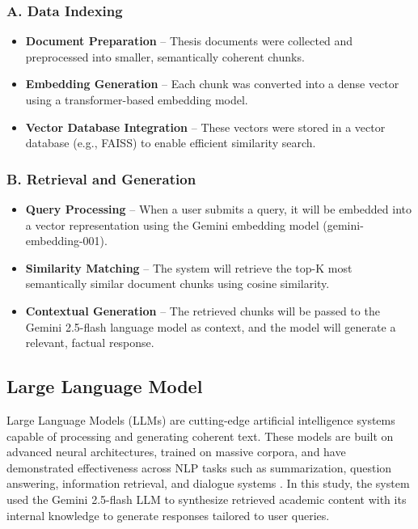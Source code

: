\begin{refsection}
\subsubsection*{A. Data Indexing}
\begin{itemize}
    \item \textbf{Document Preparation} – Thesis documents were collected and preprocessed into smaller, semantically coherent chunks.
    \item \textbf{Embedding Generation} – Each chunk was converted into a dense vector using a transformer-based embedding model.
    \item \textbf{Vector Database Integration} – These vectors were stored in a vector database (e.g., FAISS) to enable efficient similarity search.
\end{itemize}

\subsubsection*{B. Retrieval and Generation}
\begin{itemize}
    \item \textbf{Query Processing} – When a user submits a query, it will be embedded into a vector representation using the Gemini embedding model (gemini-embedding-001).
    \item \textbf{Similarity Matching} – The system will retrieve the top-K most semantically similar document chunks using cosine similarity.
    \item \textbf{Contextual Generation} – The retrieved chunks will be passed to the Gemini 2.5-flash language model as context, and the model will generate a relevant, factual response.
\end{itemize}


\subsection{Large Language Model}

Large Language Models (LLMs) are cutting-edge artificial intelligence systems capable of processing and generating coherent text. These models are built on advanced neural architectures, trained on massive corpora, and have demonstrated effectiveness across NLP tasks such as summarization, question answering, information retrieval, and dialogue systems \citeauthor{naveed2024} \citeyear{naveed2024}. In this study, the system used the Gemini 2.5-flash LLM to synthesize retrieved academic content with its internal knowledge to generate responses tailored to user queries.



\end{refsection}
